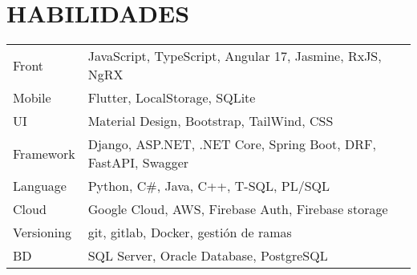\documentclass[a4paper,12pt]{article}
\begin{document}
\section{HABILIDADES}
\begin{tabularx}{\linewidth}{@{}l X@{}}
Front &  \normalsize{JavaScript, TypeScript, Angular 17, Jasmine, RxJS, NgRX}\\
Mobile & \normalsize{Flutter, LocalStorage, SQLite } \\
UI  &  \normalsize{Material Design, Bootstrap, TailWind, CSS}\\  
Framework  &  \normalsize{Django, ASP.NET, .NET Core, Spring Boot, DRF, FastAPI, Swagger}\\
Language  &  \normalsize{Python, C\#, Java, C++, T-SQL, PL/SQL }\\
Cloud  &  \normalsize{Google Cloud, AWS, Firebase Auth, Firebase storage}\\
Versioning  &  \normalsize{git, gitlab, Docker, gestión de ramas}\\
BD  &  \normalsize{SQL Server, Oracle Database, PostgreSQL }\\
\end{tabularx}



\vfill
{}
\end{document}
